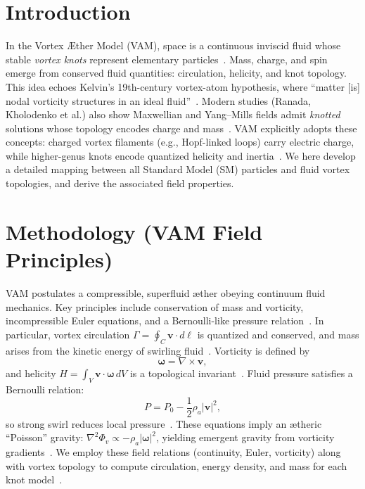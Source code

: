 \documentclass[a4paper,12pt]{article}
\begin{document}
\section*{Introduction}
In the Vortex \AE ther Model (VAM), space is a continuous inviscid fluid whose stable \textit{vortex knots} represent elementary particles~\cite{vam-lagrangian}. Mass, charge, and spin emerge from conserved fluid quantities: circulation, helicity, and knot topology. This idea echoes Kelvin's 19th-century vortex-atom hypothesis, where ``matter [is] nodal vorticity structures in an ideal fluid''~\cite{kelvin-vortex}. Modern studies (Ranada, Kholodenko et al.) also show Maxwellian and Yang--Mills fields admit \textit{knotted} solutions whose topology encodes charge and mass~\cite{kholodenko-knots}. VAM explicitly adopts these concepts: charged vortex filaments (e.g., Hopf-linked loops) carry electric charge, while higher-genus knots encode quantized helicity and inertia~\cite{kholodenko-knots, vam-lagrangian}. We here develop a detailed mapping between all Standard Model (SM) particles and fluid vortex topologies, and derive the associated field properties.

\section*{Methodology (VAM Field Principles)}
VAM postulates a compressible, superfluid \ae ther obeying continuum fluid mechanics. Key principles include conservation of mass and vorticity, incompressible Euler equations, and a Bernoulli-like pressure relation~\cite{vam-lagrangian}. In particular, vortex circulation $\Gamma=\oint_C\mathbf{v}\cdot d\boldsymbol{\ell}$ is quantized and conserved, and mass arises from the kinetic energy of swirling fluid~\cite{vam-lagrangian, helicity-appendix}. Vorticity is defined by
\[
\boldsymbol{\omega} = \nabla \times \mathbf{v},
\]
and helicity $H=\int_V \mathbf{v}\cdot\boldsymbol{\omega}\,dV$ is a topological invariant~\cite{helicity-appendix}. Fluid pressure satisfies a Bernoulli relation:
\[
P = P_0 - \frac{1}{2}\rho_a |\mathbf{v}|^2,
\]
so strong swirl reduces local pressure~\cite{vam-lagrangian}. These equations imply an \ae theric ``Poisson'' gravity: $\nabla^2\Phi_v \propto -\rho_a|\boldsymbol{\omega}|^2$, yielding emergent gravity from vorticity gradients~\cite{vam-lagrangian}. We employ these field relations (continuity, Euler, vorticity) along with vortex topology to compute circulation, energy density, and mass for each knot model~\cite{helicity-appendix, mass-appendix}.
\end{document}
